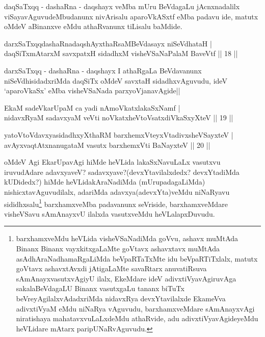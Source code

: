 \begin{artha}
daqSaTxqq - dashaRna - daqshayx veMba mUru BeVdagaLu jAcnxnadalilx  viSayavAguvudeMbudanunx nivArisalu aparoVkASxtf eMba padavu ide, matutx oMdeV aBinanxve eMdu athaRvanunx tiLisalu baMdide.
\end{artha}


\begin{shl}
darxSaTxqqdashaRnadaqshAyxthaRsaMBeVdasayx niSeVdhataH |\\
daqSiTxmAtarxM savxpatxH sidadhxM visheVSaNaPalaM BaveVtf \hfill || 18 ||
\end{shl}

\begin{artha}
darxSaTxqq - dashaRna - daqshayx I athaRgaLa BeVdavanunx niSeVdhisidadxriMda daqSiTx oMdeV savxtaH sidadhxvAguvudu, ideV `aparoVkaSx' eMba visheVSaNada parxyoVjanavAgide||
\end{artha}


\begin{shl}
EkaM sadeVkarUpaM ca yadi nAmoVkatxlakaSxNamf |\\
nidavxRyaM sadavxyaM veVti noVkatxheVtoVsatxdiVkaSxyXteV \hfill || 19 ||
\end{shl}

\begin{shl}
yatoV\s toV\s davxyasidadhxyXthaRM barxhemxVteyxVtadivxsheVSayxteV |\\
avAyxvaqtAtxnanugataM vasutx barxhemxVti BaNayxteV \hfill || 20 ||
\end{shl}

\begin{artha}
oMdeV Agi EkarUpavAgi hiMde heVLida lakaSxNavuLaLx vasutxvu iruvudAdare adavxyaveV? sadavxyave?(devxYtavilalxdedx? devxYtadiMda kUDidedx?) hiMde heVLidakAraNadiMda (mUrupadagaLiMda) nishicxtavAguvudilalx, adariMda adavxya(adevxYta)veMdu niNaRyavu sididhxsalu\footnote{barxhamxveMdu heVLida visheVSaNadiMda goVvu, ashavx muMtAda Binanx Binanx vayxkitxgaLaMte goVtavx ashavxtavx muMtAda asAdhAraNadhamaRgaLiMda beVpaRTaTxMte idu beVpaRTiTxlalx, matutx goVtavx ashavxtAvxdi jAtigaLaMte savaRtarx anuvatiRsuva sAmAnayxvasutxvAgiyU ilalx, EkeMdare ideV adivxtiVyavAgiruvAga sakalaBeVdagaLU Binanx vasutxgaLu tananx biTuTx beVreyAgilalxvAdadxriMda nidavxRya devxYtavilalxde EkameVva adivxtiVyaM eMdu niNaRya vAguvudu, barxhamxveMdare sAmAnayxvAgi niratishaya mahatavxvuLaLxdeMdu athaRvide, adu adivxtiVyavAgideyeMdu heVLidare mAtarx paripUNaRvAguvudu.} barxhamxveMba padavanunx seVriside, barxhamxveMdare visheVSavu sAmAnayxvU ilalxda vasutxveMdu heVLalapxDuvudu.
\end{artha}
